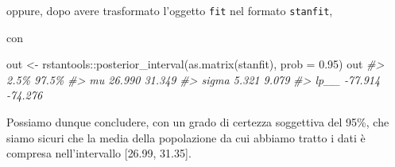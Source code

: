 \documentclass[
  11pt,
]{krantz}
\makeatletter
\newenvironment{Shaded}{\begin{snugshade}}{\end{snugshade}}
\newcommand{\AttributeTok}[1]{\textcolor[rgb]{0.61,0.61,0.61}{#1}}
\newcommand{\CommentTok}[1]{\textcolor[rgb]{0.37,0.37,0.37}{\textit{#1}}}
\newcommand{\FloatTok}[1]{\textcolor[rgb]{0.06,0.06,0.06}{#1}}
\newcommand{\FunctionTok}[1]{\textcolor[rgb]{0,0,0}{#1}}
\newcommand{\NormalTok}[1]{#1}
\newcommand{\OtherTok}[1]{\textcolor[rgb]{0.37,0.37,0.37}{#1}}
\newcommand{\SpecialCharTok}[1]{\textcolor[rgb]{0,0,0}{#1}}
\newcommand{\StringTok}[1]{\textcolor[rgb]{0.5,0.5,0.5}{#1}}
\newenvironment{kframe}{%
\medskip{}
\setlength{\fboxsep}{.8em}
 \def\at@end@of@kframe{}%
 \ifinner\ifhmode%
  \def\at@end@of@kframe{\end{minipage}}%
  \begin{minipage}{\columnwidth}%
 \fi\fi%
 \def\FrameCommand##1{\hskip\@totalleftmargin \hskip-\fboxsep
 \colorbox{shadecolor}{##1}\hskip-\fboxsep
     \hskip-\linewidth \hskip-\@totalleftmargin \hskip\columnwidth}%
 \MakeFramed {\advance\hsize-\width
   \@totalleftmargin\z@ \linewidth\hsize
   \@setminipage}}%
 {\par\unskip\endMakeFramed%
 \at@end@of@kframe}
\renewenvironment{Shaded}{\begin{kframe}}{\end{kframe}}
\theoremstyle{definition}
\theoremstyle{definition}
\theoremstyle{definition}
\theoremstyle{definition}
\theoremstyle{remark}
\makeatother
\begin{document}
\begin{Shaded}
\end{Shaded}

oppure, dopo avere trasformato l'oggetto \texttt{fit} nel formato \texttt{stanfit},

\begin{Shaded}
\end{Shaded}

con

\begin{Shaded}
\begin{Highlighting}[]
\NormalTok{out }\OtherTok{\textless{}{-}}\NormalTok{ rstantools}\SpecialCharTok{::}\FunctionTok{posterior\_interval}\NormalTok{(}\FunctionTok{as.matrix}\NormalTok{(stanfit), }\AttributeTok{prob =} \FloatTok{0.95}\NormalTok{)}
\NormalTok{out}
\CommentTok{\#\textgreater{}          2.5\%   97.5\%}
\CommentTok{\#\textgreater{} mu     26.990  31.349}
\CommentTok{\#\textgreater{} sigma   5.321   9.079}
\CommentTok{\#\textgreater{} lp\_\_  {-}77.914 {-}74.276}
\end{Highlighting}
\end{Shaded}

Possiamo dunque concludere, con un grado di certezza soggettiva del 95\%, che siamo sicuri che la media della popolazione da cui abbiamo tratto i dati è compresa nell'intervallo {[}26.99, 31.35{]}.
\end{document}
